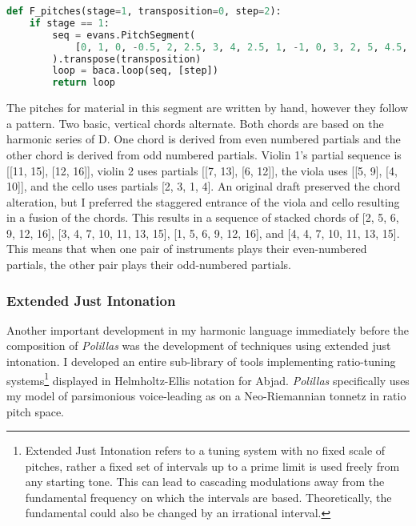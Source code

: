 \begin{lstlisting}[language=Python,frame=tb,caption={Material F pitches in Polillas},label=lst:p-f-pitch]
def F_pitches(stage=1, transposition=0, step=2):
    if stage == 1:
        seq = evans.PitchSegment(
            [0, 1, 0, -0.5, 2, 2.5, 3, 4, 2.5, 1, -1, 0, 3, 2, 5, 4.5, 3]
        ).transpose(transposition)
        loop = baca.loop(seq, [step])
        return loop
\end{lstlisting}

The pitches for material  in this segment are written by hand, however they follow a pattern. Two basic, vertical chords alternate. Both chords are based on the harmonic series of D. One chord is derived from even numbered partials and the other chord is derived from odd numbered partials. Violin 1's partial sequence is [[11, 15], [12, 16]], violin 2 uses partials [[7, 13], [6, 12]], the viola uses [[5, 9], [4, 10]], and the cello uses partials [2, 3, 1, 4]. An original draft preserved the chord alteration, but I preferred the staggered entrance of the viola and cello resulting in a fusion of the chords. This results in a sequence of stacked chords of [2, 5, 6, 9, 12, 16], [3, 4, 7, 10, 11, 13, 15], [1, 5, 6, 9, 12, 16], and [4, 4, 7, 10, 11, 13, 15]. This means that when one pair of instruments plays their even-numbered partials, the other pair plays their odd-numbered partials.

\subsubsection{Extended Just Intonation}

Another important development in my harmonic language immediately before the composition of \textit{Polillas} was the development of techniques using extended just intonation. I developed an entire sub-library of tools implementing ratio-tuning systems\footnote{Extended Just Intonation refers to a tuning system with no fixed scale of pitches, rather a fixed set of intervals up to a prime limit is used freely from any starting tone. This can lead to cascading modulations away from the fundamental frequency on which the intervals are based. Theoretically, the fundamental could also be changed by an irrational interval.} displayed in Helmholtz-Ellis notation for Abjad. \textit{Polillas} specifically uses my model of parsimonious voice-leading as on a Neo-Riemannian tonnetz in ratio pitch space.


